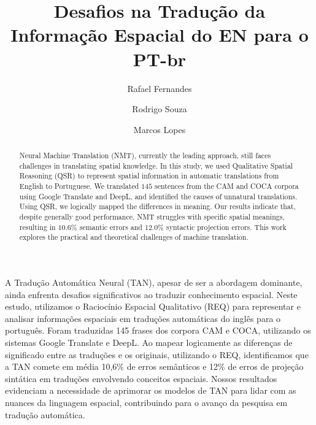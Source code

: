 \documentclass[a4paper, twocolumn, 11pt, twoside]{article}
\title{Desafios na Tradução da Informação Espacial do EN para o PT-br}
\author{
  Rafael Fernandes
  \instituto{Universidade de São Paulo}
  \email{rafael.macario@usp.br} 
  \and 
  Rodrigo Souza
 \instituto{Universidade de São Paulo}
  \email{rodrigo.aparecido.souza@usp.br}
  \and
  Marcos Lopes
  \instituto{Universidade de São Paulo}
  \email{marcoslopes@usp.br}
  \and
}
\begin{document}
\maketitle

\begin{resumo}
  A Tradução Automática Neural (TAN), apesar de ser a abordagem dominante, ainda enfrenta desafios significativos ao traduzir conhecimento espacial. Neste estudo, utilizamos o Raciocínio Espacial Qualitativo (REQ) para representar e analisar informações espaciais em traduções automáticas do inglês para o português. Foram traduzidas 145 frases dos corpora CAM e COCA, utilizando os sistemas Google Translate e DeepL. Ao mapear logicamente as diferenças de significado entre as traduções e os originais, utilizando o REQ, identificamos que a TAN comete em média 10,6\% de erros semânticos e 12\% de erros de projeção sintática em traduções envolvendo conceitos espaciais. Nossos resultados evidenciam a necessidade de aprimorar os modelos de TAN para lidar com as nuances da linguagem espacial, contribuindo para o avanço da pesquisa em tradução automática.
\end{resumo}


\begin{abstract}
  Neural Machine Translation (NMT), currently the leading approach, still faces challenges in translating spatial knowledge. In this study, we used Qualitative Spatial Reasoning (QSR) to represent spatial information in automatic translations from English to Portuguese. We translated $145$ sentences from the CAM and COCA corpora using Google Translate and DeepL, and identified the causes of unnatural translations. Using QSR, we logically mapped the differences in meaning. Our results indicate that, despite generally good performance, NMT struggles with specific spatial meanings, resulting in $10.6\%$ semantic errors and $12.0\%$ syntactic projection errors. This work explores the practical and theoretical challenges of machine translation.
\end{abstract}

\end{document}

